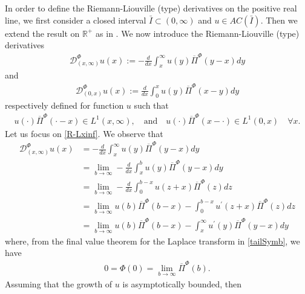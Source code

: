 \documentclass[11pt,a4paper]{article}
\theoremstyle{plain}
\theoremstyle{definition}
\theoremstyle{remark}
\begin{document}
		In order to define the Riemann-Liouville (type) derivatives on the positive real line, we first consider a closed interval $\bar{I} \subset (0,\infty)$ and $u \in AC(\bar{I})$. 
		Then we extend the result on $\mathbb{R}^+$ as in \cite[page 79]{kilbas2006theory}. We now introduce the Riemann-Liouville (type) derivatives
		\begin{align}
			\label{R-Lxinf}
			\mathcal{D}_{(x,\infty)}^\Phi u(x):=-\frac{d}{dx} \int_x^\infty u(y) \overline{\Pi}^\Phi(y-x) dy
		\end{align}
		and
		\begin{align}
			\label{R-L0x}
			\mathcal{D}_{(0,x)}^\Phi u(x):=\frac{d}{dx} \int_0^x u(y) \overline{\Pi}^\Phi(x-y) dy
		\end{align}
		respectively defined for function $u$ such that 
		\begin{align*}
			u(\cdot) \overline{\Pi}^\Phi(\cdot-x) \in L^1(x,\infty), \quad \text{and} \quad u(\cdot) \overline{\Pi}^\Phi(x-\cdot) \in L^1(0,x) \quad \forall x.
		\end{align*}
		Let us focus on \eqref{R-Lxinf}. We observe that
		\begin{align*}
			\mathcal{D}_{(x,\infty)}^\Phi u(x)	&=-\frac{d}{dx} \int_x^\infty u(y) \overline{\Pi}^\Phi(y-x) dy\\&=\lim_{b \to \infty} -\frac{d}{dx} \int_x^b u(y) \overline{\Pi}^\Phi(y-x) dy\\
			&=\lim_{b \to \infty} -\frac{d}{dx} \int_0^{b-x} u(z+x) \overline{\Pi}^\Phi(z) dz\\
			&=\lim_{b \to \infty} u(b) \overline{\Pi}^\Phi(b-x) - \int_0^{b-x} u^\prime(z+x) \overline{\Pi}^\Phi(z) dz\\
			&=\lim_{b \to \infty} u(b) \overline{\Pi}^\Phi(b-x) - \int_x^{\infty} u^\prime(y) \overline{\Pi}^\Phi(y-x) dy
		\end{align*}
		where, from the final value theorem for the Laplace transform in \eqref{tailSymb}, we have
		\begin{align*}
			0=\Phi(0)=\lim_{b \to \infty} \overline{\Pi}^\Phi(b).
		\end{align*}
		Assuming that the growth of $u$ is asymptotically bounded, then
\end{document}
